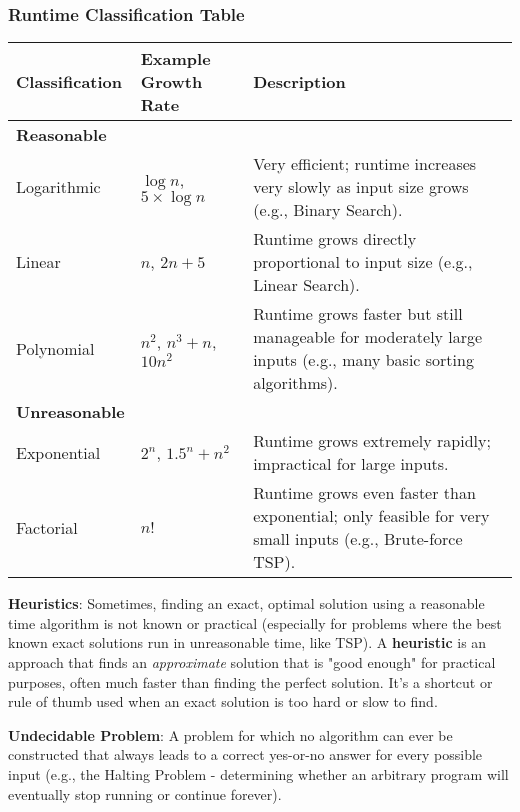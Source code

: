 \documentclass[11pt,oneside]{book}
\begin{document}
\subsubsection*{Runtime Classification Table}

\begin{tabularx}{\textwidth}{l l X}
\toprule
\textbf{Classification} & \textbf{Example Growth Rate} & \textbf{Description} \\
\midrule
\textbf{Reasonable} & & \\
\hspace{1em} Logarithmic & $\log n$, $5 \times \log n$ & Very efficient; runtime increases very slowly as input size grows (e.g., Binary Search). \\
\hspace{1em} Linear & $n$, $2n + 5$ & Runtime grows directly proportional to input size (e.g., Linear Search). \\
\hspace{1em} Polynomial & $n^2$, $n^3 + n$, $10n^2$ & Runtime grows faster but still manageable for moderately large inputs (e.g., many basic sorting algorithms). \\
\midrule
\textbf{Unreasonable} & & \\
\hspace{1em} Exponential & $2^n$, $1.5^n + n^2$ & Runtime grows extremely rapidly; impractical for large inputs. \\
\hspace{1em} Factorial & $n!$ & Runtime grows even faster than exponential; only feasible for very small inputs (e.g., Brute-force TSP). \\
\bottomrule
\end{tabularx}

\textbf{Heuristics}: Sometimes, finding an exact, optimal solution using a reasonable time algorithm is not known or practical (especially for problems where the best known exact solutions run in unreasonable time, like TSP). A \textbf{heuristic} is an approach that finds an \textit{approximate} solution that is "good enough" for practical purposes, often much faster than finding the perfect solution. It's a shortcut or rule of thumb used when an exact solution is too hard or slow to find.

\textbf{Undecidable Problem}: A problem for which no algorithm can ever be constructed that always leads to a correct yes-or-no answer for every possible input (e.g., the Halting Problem - determining whether an arbitrary program will eventually stop running or continue forever).
\end{document}

